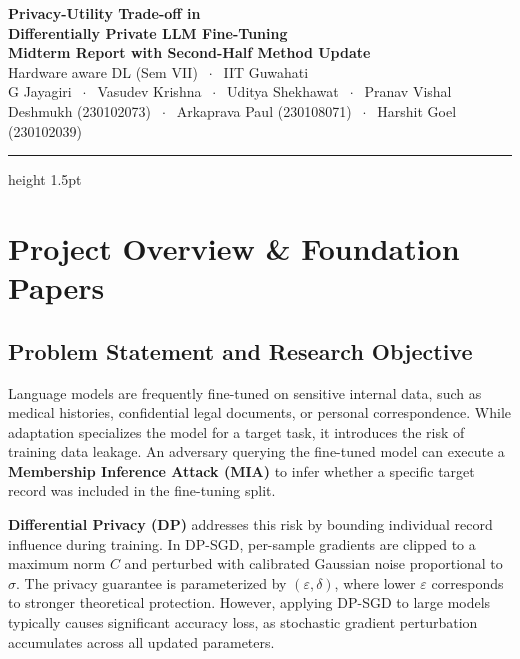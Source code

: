 \documentclass[11pt,a4paper]{article}
\begin{document}
\begin{center}
  {\LARGE\bfseries\color{iitblue}
    Privacy-Utility Trade-off in\\[3pt]
    Differentially Private LLM Fine-Tuning}\\[6pt]
  {\large\textbf{Midterm Report with Second-Half Method Update}}\\[4pt]
  {\normalsize Hardware aware DL (Sem VII) $\;\cdot\;$ IIT Guwahati }\\[4pt]
  {\normalsize
    G Jayagiri $\;\cdot\;$
    Vasudev Krishna $\;\cdot\;$
    Uditya Shekhawat $\;\cdot\;$
    Pranav Vishal Deshmukh (230102073) $\;\cdot\;$
    Arkaprava Paul (230108071) $\;\cdot\;$
    Harshit Goel (230102039)}
\end{center}
\vspace{1mm}
{\color{iitblue}\hrule height 1.5pt}
\vspace{4mm}

\section{Project Overview \& Foundation Papers}

\subsection{Problem Statement and Research Objective}

Language models are frequently fine-tuned on sensitive internal data, such as medical
histories, confidential legal documents, or personal correspondence. While adaptation
specializes the model for a target task, it introduces the risk of training data leakage.
An adversary querying the fine-tuned model can execute a \textbf{Membership Inference Attack (MIA)}
to infer whether a specific target record was included in the fine-tuning split.

\textbf{Differential Privacy (DP)} addresses this risk by bounding individual record
influence during training. In DP-SGD, per-sample gradients are clipped to a maximum norm $C$
and perturbed with calibrated Gaussian noise proportional to $\sigma$. The privacy guarantee
is parameterized by $(\varepsilon, \delta)$, where lower $\varepsilon$ corresponds to stronger
theoretical protection. However, applying DP-SGD to large models typically causes significant
accuracy loss, as stochastic gradient perturbation accumulates across all updated parameters.
\end{document}
